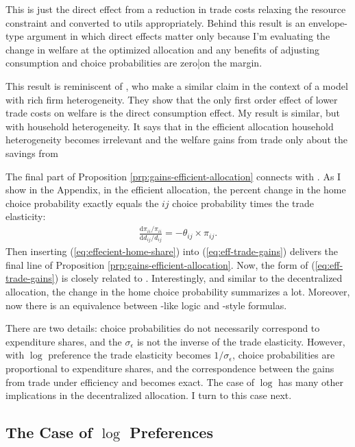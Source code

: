 \documentclass[12pt,pdftex]{article}
\begin{document}
\begin{onehalfspacing}
This is just the direct effect from a reduction in trade costs relaxing the resource constraint and converted to utils appropriately. Behind this result is an envelope-type argument in which direct effects matter only because I'm evaluating the change in welfare at the optimized allocation and any benefits of adjusting consumption and choice probabilities are zero|on the margin.

This result is reminiscent of \citet{AtkesonBurstein2010}, who make a similar claim in the context of a model with rich firm heterogeneity. They show that the only first order effect of lower trade costs on welfare is the direct consumption effect. My result is similar, but with household heterogeneity. It says that in the efficient allocation household heterogeneity becomes irrelevant and the welfare gains from trade only about the savings from

The final part of Proposition \ref{prp:gains-efficient-allocation} connects with \citet{arkolakis2012new}. As I show in the Appendix, in the efficient allocation, the percent change in the home choice probability exactly equals the $ij$ choice probability times the trade elasticity:
\begin{align}
\frac{\mathrm{d} \pi_{ii} / \pi_{ii}}{\mathrm{d} d_{ij} / d_{ij}} = -\theta_{ij} \times \pi_{ij}.
\label{eq:effecient-home-share}
\end{align}
Then inserting (\ref{eq:effecient-home-share}) into  (\ref{eq:eff-trade-gains}) delivers the final line of Proposition \ref{prp:gains-efficient-allocation}. Now, the form of (\ref{eq:eff-trade-gains}) is closely related to \citet{arkolakis2012new}. Interestingly, and similar to the decentralized allocation, the change in the home choice probability summarizes a lot. Moreover, now there is an equivalence between \citet{AtkesonBurstein2010}-like logic and \citet{arkolakis2012new}-style formulas.

There are two details: choice probabilities do not necessarily correspond to expenditure shares, and the $\sigma_{\epsilon}$ is not the inverse of the trade elasticity. However, with $\log$ preference the trade elasticity becomes $1 / \sigma_{\epsilon}$, choice probabilities are proportional to expenditure shares, and the correspondence between the gains from trade under efficiency and \citet{arkolakis2012new} becomes exact. The case of $\log$ has many other implications in the decentralized allocation. I turn to this case next.

\subsection{The Case of $\log$ Preferences}\label{sec:log-preferences}


\end{onehalfspacing}
\end{document}
